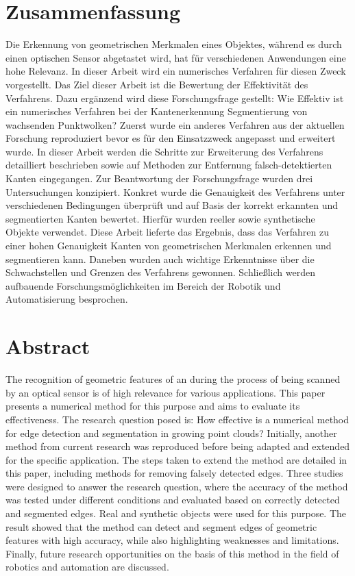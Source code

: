 \section*{\centering Zusammenfassung}
Die Erkennung von geometrischen Merkmalen eines Objektes, während es durch einen optischen Sensor abgetastet wird, hat für verschiedenen Anwendungen eine hohe Relevanz. In dieser Arbeit wird ein numerisches Verfahren für diesen Zweck vorgestellt. Das Ziel dieser Arbeit ist die Bewertung der Effektivität des Verfahrens. Dazu ergänzend wird diese Forschungsfrage gestellt: Wie Effektiv ist ein numerisches Verfahren bei der Kantenerkennung Segmentierung von wachsenden Punktwolken? Zuerst wurde ein anderes Verfahren aus der aktuellen Forschung reproduziert bevor es für den Einsatzzweck angepasst und erweitert wurde. In dieser Arbeit werden die Schritte zur Erweiterung des Verfahrens detailliert beschrieben sowie auf Methoden zur Entfernung falsch-detektierten Kanten eingegangen. Zur Beantwortung der Forschungsfrage wurden drei Untersuchungen konzipiert. Konkret wurde die Genauigkeit des Verfahrens unter verschiedenen Bedingungen überprüft und auf Basis der korrekt erkannten und segmentierten Kanten bewertet. Hierfür wurden reeller sowie synthetische Objekte verwendet. Diese Arbeit lieferte das Ergebnis, dass das Verfahren zu einer hohen Genauigkeit Kanten von geometrischen Merkmalen erkennen und segmentieren kann. Daneben wurden auch wichtige Erkenntnisse über die Schwachstellen und Grenzen des Verfahrens gewonnen. Schließlich werden aufbauende Forschungsmöglichkeiten im Bereich der Robotik und Automatisierung besprochen.

\section*{\centering Abstract}
The recognition of geometric features of an during the process of being scanned by an optical sensor is of high relevance for various applications. This paper presents a numerical method for this purpose and aims to evaluate its effectiveness. The research question posed is: How effective is a numerical method for edge detection and segmentation in growing point clouds? Initially, another method from current research was reproduced before being adapted and extended for the specific application. The steps taken to extend the method are detailed in this paper, including methods for removing falsely detected edges. Three studies were designed to answer the research question, where the accuracy of the method was tested under different conditions and evaluated based on correctly detected and segmented edges. Real and synthetic objects were used for this purpose. The result showed that the method can detect and segment edges of geometric features with high accuracy, while also highlighting weaknesses and limitations. Finally, future research opportunities on the basis of this method in the field of robotics and automation are discussed.
